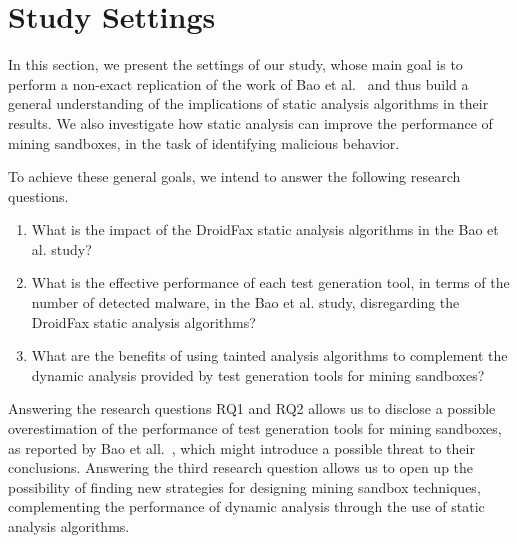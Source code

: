 \section{Study Settings}

In this section, we present the settings of our study, whose main goal is to perform a non-exact replication of the work of Bao et al.~\cite{DBLP:conf/wcre/BaoLL18} and thus build
a general understanding of the implications of static analysis algorithms in their results. We also investigate how static analysis can improve
the performance of mining sandboxes, in the task of identifying malicious behavior.

To achieve these general goals, we intend to answer the following research questions.

\begin{enumerate}[(RQ1)]
 \item What is the impact of the DroidFax static analysis algorithms in the Bao et al. study?
  
 \item What is the effective performance of each test generation tool, in terms of the number of detected malware, in the Bao et al. study, disregarding the DroidFax
  static analysis algorithms?

 \item What are the benefits of using tainted analysis algorithms to complement the dynamic analysis provided by test generation tools for mining sandboxes?
\end{enumerate}

Answering the research questions RQ1 and RQ2 allows us to disclose a possible overestimation  of the performance of test generation tools for mining sandboxes,
as reported by Bao et all.~\cite{DBLP:conf/wcre/BaoLL18}, which might introduce a possible threat to their conclusions. Answering the third research question
allows us to open up the possibility of finding new strategies for designing mining sandbox techniques, complementing the performance of
dynamic analysis through the use of static analysis algorithms.


